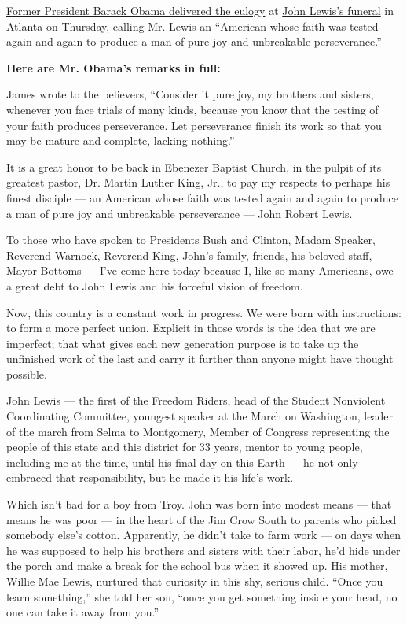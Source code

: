 \href{https://www.nytimes.com/2020/07/30/us/politics/john-lewis-funeral-barack-obama.html}{Former
President Barack Obama delivered the eulogy} at
\href{https://www.nytimes.com/2020/07/30/us/john-lewis-live-funeral.html}{John
Lewis's funeral} in Atlanta on Thursday, calling Mr. Lewis an ``American
whose faith was tested again and again to produce a man of pure joy and
unbreakable perseverance.''

\textbf{Here are Mr. Obama's remarks in full:}

James wrote to the believers, ``Consider it pure joy, my brothers and
sisters, whenever you face trials of many kinds, because you know that
the testing of your faith produces perseverance. Let perseverance finish
its work so that you may be mature and complete, lacking nothing.''

It is a great honor to be back in Ebenezer Baptist Church, in the pulpit
of its greatest pastor, Dr. Martin Luther King, Jr., to pay my respects
to perhaps his finest disciple --- an American whose faith was tested
again and again to produce a man of pure joy and unbreakable
perseverance --- John Robert Lewis.

To those who have spoken to Presidents Bush and Clinton, Madam Speaker,
Reverend Warnock, Reverend King, John's family, friends, his beloved
staff, Mayor Bottoms --- I've come here today because I, like so many
Americans, owe a great debt to John Lewis and his forceful vision of
freedom.

Now, this country is a constant work in progress. We were born with
instructions: to form a more perfect union. Explicit in those words is
the idea that we are imperfect; that what gives each new generation
purpose is to take up the unfinished work of the last and carry it
further than anyone might have thought possible.

John Lewis --- the first of the Freedom Riders, head of the Student
Nonviolent Coordinating Committee, youngest speaker at the March on
Washington, leader of the march from Selma to Montgomery, Member of
Congress representing the people of this state and this district for 33
years, mentor to young people, including me at the time, until his final
day on this Earth --- he not only embraced that responsibility, but he
made it his life's work.

Which isn't bad for a boy from Troy. John was born into modest means ---
that means he was poor --- in the heart of the Jim Crow South to parents
who picked somebody else's cotton. Apparently, he didn't take to farm
work --- on days when he was supposed to help his brothers and sisters
with their labor, he'd hide under the porch and make a break for the
school bus when it showed up. His mother, Willie Mae Lewis, nurtured
that curiosity in this shy, serious child. ``Once you learn something,''
she told her son, ``once you get something inside your head, no one can
take it away from you.''

